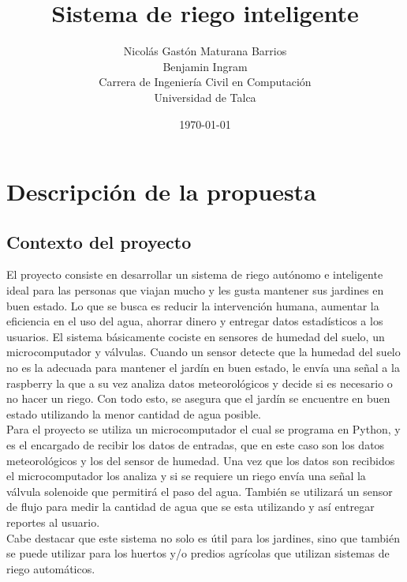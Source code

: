 \documentclass[11pt,letterpaper]{article}
\begin{document}
\pagestyle{empty}

\title{
Sistema de riego inteligente\\
}
\author{
Nicolás Gastón Maturana Barrios\\
Benjamin Ingram\\
Carrera de Ingeniería Civil en Computación\\ 
Universidad de Talca}
\date{\today}

\maketitle


\section{Descripción de la propuesta}

\subsection{Contexto del proyecto}
El proyecto consiste en desarrollar un sistema de riego autónomo e inteligente ideal para las personas que viajan mucho y les gusta mantener sus jardines en buen estado. Lo que se busca es reducir la intervención humana, aumentar la eficiencia en el uso del agua, ahorrar dinero y entregar datos estadísticos a los usuarios. El sistema básicamente cociste en sensores de humedad del suelo, un microcomputador y válvulas. Cuando un sensor detecte que la humedad del suelo no es la adecuada para mantener el jardín en buen estado, le envía una señal a la raspberry la que a su vez analiza datos meteorológicos y decide si es necesario o no hacer un riego. Con todo esto, se asegura que el jardín se encuentre en buen estado utilizando la menor cantidad de agua posible.\\
Para el proyecto se utiliza un microcomputador el cual se programa en Python, y es el encargado de recibir los datos de entradas, que en este caso son los datos meteorológicos y los del sensor de humedad. Una vez que los datos son recibidos el microcomputador los analiza y si se requiere un riego envía una señal la válvula solenoide que permitirá el paso del agua. También se utilizará un sensor de flujo para medir la cantidad de agua que se esta utilizando y así entregar reportes al usuario.\\
Cabe destacar que este sistema no solo es útil para los jardines, sino que también se puede utilizar para los huertos y/o predios agrícolas que utilizan sistemas de riego automáticos.
\end{document}
